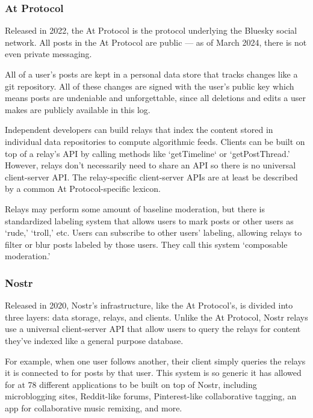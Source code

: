 \subsubsection{At Protocol}

Released in 2022, the At Protocol is the protocol underlying the Bluesky social network.
All posts in the At Protocol are public --- as of March 2024, there is not even private messaging.

All of a user's posts are kept in a personal data store that tracks changes like a git repository. All of these changes are signed with the user's public key which means posts are undeniable and unforgettable, since all deletions and edits a user makes are publicly available in this log.

Independent developers can build relays that index the content stored in individual data repositories to compute algorithmic feeds. Clients can be built on top of a relay's API by calling methods like `getTimeline` or `getPostThread.' However, relays don't necessarily need to share an API so there is no universal client-server API.
The relay-specific client-server APIs are at least be described by a common At Protocol-specific lexicon.

Relays may perform some amount of baseline moderation, but there is standardized labeling system that allows users to mark posts or other users as `rude,' `troll,' etc.
Users can subscribe to other users' labeling, allowing relays to filter or blur posts labeled by those users.
They call this system `composable moderation.'

\subsubsection{Nostr}

Released in 2020, Nostr's infrastructure, like the At Protocol's, is divided into three layers: data storage, relays, and clients.
Unlike the At Protocol, Nostr relays use a universal client-server API that allow users to query the relays for content they've indexed like a general purpose database.

For example, when one user follows another, their client simply queries the relays it is connected to for posts by that user.
This system is so generic it has allowed for at 78 different applications to be built on top of Nostr, including microblogging sites, Reddit-like forums, Pinterest-like collaborative tagging, an app for collaborative music remixing, and more.

